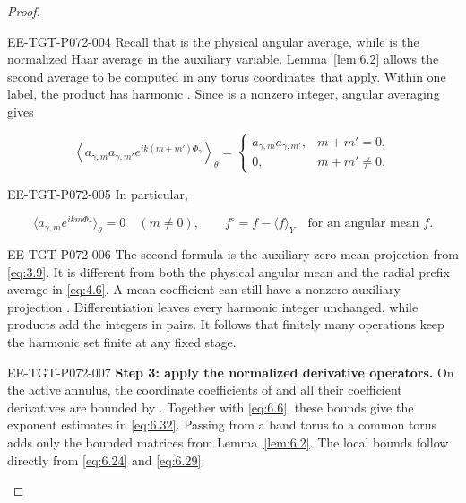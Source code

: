 \begin{proof}
\begin{EESegment}{EE-TGT-P072-004}
Recall that  is the physical angular average, while  is the normalized Haar average in the auxiliary variable. Lemma~\ref{lem:6.2} allows the second average to be computed in any torus coordinates that apply. Within one label, the product has harmonic . Since  is a nonzero integer, angular averaging gives
\end{EESegment}
\[
  \left\langle
    a_{\gamma,m}a_{\gamma,m'}e^{ik(m+m')\Phi_\gamma}
  \right\rangle_\theta
  =
  \begin{cases}
    a_{\gamma,m}a_{\gamma,m'},&m+m'=0,\\
    0,&m+m'\ne0.
  \end{cases}
\]
\begin{EESegment}{EE-TGT-P072-005}
In particular,
\end{EESegment}
\[
  \langle a_{\gamma,m}e^{ikm\Phi_\gamma}\rangle_\theta=0
  \quad(m\ne0),
  \qquad
  f^\circ=f-\langle f\rangle_Y
  \quad\text{for an angular mean }f.
\]
\begin{EESegment}{EE-TGT-P072-006}
The second formula is the auxiliary zero-mean projection from \eqref{eq:3.9}. It is different from both the physical angular mean and the radial prefix average  in \eqref{eq:4.6}. A mean coefficient can still have a nonzero auxiliary projection . Differentiation leaves every harmonic integer unchanged, while products add the integers in pairs. It follows that finitely many operations keep the harmonic set finite at any fixed stage.
\end{EESegment}

\begin{EESegment}{EE-TGT-P072-007}
\textbf{Step 3: apply the normalized derivative operators.} On the active annulus, the coordinate coefficients of  and all their coefficient derivatives are bounded by . Together with \eqref{eq:6.6}, these bounds give the exponent estimates in \eqref{eq:6.32}. Passing from a band torus to a common torus adds only the bounded matrices from Lemma~\ref{lem:6.2}. The local  bounds follow directly from \eqref{eq:6.24} and \eqref{eq:6.29}.
\end{EESegment}


\end{proof}
